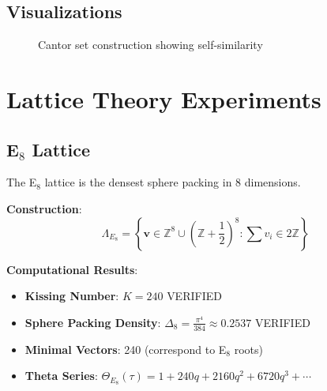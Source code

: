 \subsection{Visualizations}

\begin{figure}[H]
\centering
{}
\caption{Cantor set construction showing self-similarity}
\label{fig:cantor_set}
\end{figure}

\section{Lattice Theory Experiments}

\subsection{E$_8$ Lattice}

The E$_8$ lattice is the densest sphere packing in 8 dimensions.

\textbf{Construction}:
\begin{equation}
\Lambda_{E_8} = \left\{ \mathbf{v} \in \mathbb{Z}^8 \cup \left(\mathbb{Z} + \frac{1}{2}\right)^8 : \sum v_i \in 2\mathbb{Z} \right\}
\end{equation}

\textbf{Computational Results}:
\begin{itemize}
    \item \textbf{Kissing Number}: $K = 240$ \textcolor{validcolor}{VERIFIED}
    \item \textbf{Sphere Packing Density}: $\Delta_8 = \frac{\pi^4}{384} \approx 0.2537$ \textcolor{validcolor}{VERIFIED}
    \item \textbf{Minimal Vectors}: 240 (correspond to E$_8$ roots)
    \item \textbf{Theta Series}: $\Theta_{E_8}(\tau) = 1 + 240q + 2160q^2 + 6720q^3 + \cdots$
\end{itemize}

